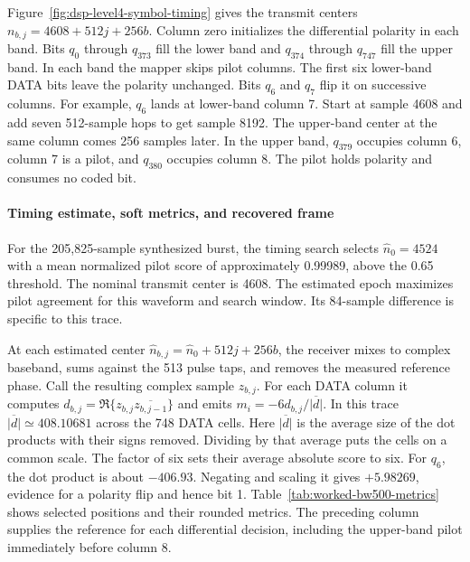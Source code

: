 Figure~\ref{fig:dsp-level4-symbol-timing} gives the transmit centers
$n_{b,j}=4608+512j+256b$. Column zero initializes the differential
polarity in each band. Bits $q_0$ through $q_{373}$ fill the lower band
and $q_{374}$ through $q_{747}$ fill the upper band. In each band the
mapper skips pilot columns. The first six lower-band DATA bits leave the
polarity unchanged. Bits $q_6$ and $q_7$ flip it on successive columns.
For example, $q_6$ lands at lower-band column 7. Start at sample 4608
and add seven 512-sample hops to get sample 8192. The upper-band center
at the same column comes 256 samples later.
In the upper band, $q_{379}$ occupies column 6, column 7 is a pilot,
and $q_{380}$ occupies column 8. The pilot holds polarity and consumes
no coded bit.

\paragraph{Timing estimate, soft metrics, and recovered frame}
For the 205,825-sample synthesized burst, the timing search selects
$\widehat n_0=4524$ with a mean normalized pilot score of approximately
0.99989, above the 0.65 threshold. The nominal transmit center is 4608.
The estimated epoch maximizes pilot agreement for this waveform and
search window. Its 84-sample difference is specific to this trace.

At each estimated center $\widehat n_{b,j}=\widehat n_0+512j+256b$,
the receiver mixes to complex baseband, sums against the 513 pulse taps,
and removes the measured reference phase. Call the resulting complex
sample $z_{b,j}$. For each DATA column it computes
$d_{b,j}=\Re\{z_{b,j}\overline{z_{b,j-1}}\}$ and emits
$m_i=-6d_{b,j}/\overline{|d|}$. In this trace
$\overline{|d|}\simeq408.10681$ across the 748 DATA cells.
Here $\overline{|d|}$ is the average size of the dot products with their
signs removed. Dividing by that average puts the cells on a common
scale. The factor of six sets their average absolute score to six.
For $q_6$, the dot product is about $-406.93$. Negating and scaling
it gives $+5.98269$, evidence for a polarity flip and hence bit 1.
Table~\ref{tab:worked-bw500-metrics} shows selected positions and their
rounded metrics. The preceding column supplies the reference for each
differential decision, including the upper-band pilot immediately before
column 8.

